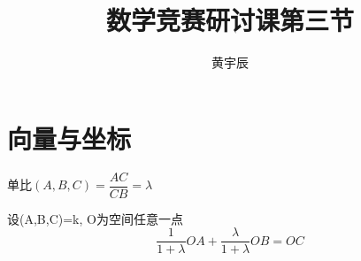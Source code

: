 \documentclass{MathNoteCN}
\title{数学竞赛研讨课第三节}
\author{黄宇辰}
\begin{document}
	\maketitle
	\section{向量与坐标}
	单比$(A,B,C)=\dfrac{AC}{CB}=\lambda$

设(A,B,C)=k, O为空间任意一点
\[\frac{1}{1+\lambda}OA+\frac{\lambda}{1+\lambda}OB=OC\]
\end{document}
